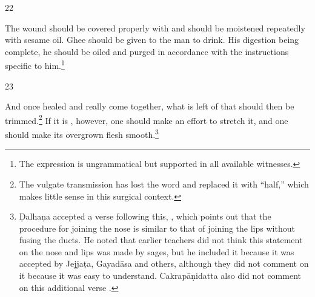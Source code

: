 \begin{translation}
\begin{sloka}
\end{sloka}    
\item[22] 
\begin{sloka}
 The wound should be covered properly with  and should be
moistened repeatedly with sesame oil.  Ghee should be given to the man to drink. 
His digestion being complete, he should be oiled and purged in accordance with
the instructions specific to him.\footnote{The expression 
    is ungrammatical but supported in all available witnesses.}
\end{sloka}
    
\item[23] %
\begin{sloka}
And once healed and really come together, what is left of that  should then be trimmed.\footnote{The vulgate transmission has lost the
    word  and replaced it with  “half,” which makes little
    sense in this surgical  context.} If it is , however, one should
    make an effort to stretch it, and one should make its overgrown flesh
    smooth.\footnote{Ḍalhaṇa  accepted a verse following this, , which
        points out that the procedure for joining the nose is similar to that of joining
        the lips without fusing the ducts. He noted that earlier teachers did not think
        this statement on the nose and lips was made by sages, but he included it because
        it was accepted by Jejjaṭa, Gayadāsa and others, although they did not comment on
        it because it was easy to understand. Cakrapāṇidatta also did not comment on this
        additional verse \citep[133]{acar-1939}.}

\end{sloka}    
    
\end{translation}    
